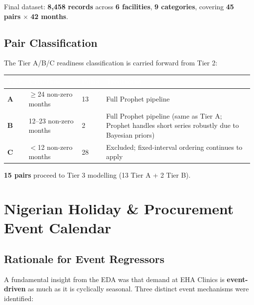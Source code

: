 \documentclass[12pt, a4paper]{article}
\begin{document}
Final dataset: \textbf{8,458 records} across \textbf{6 facilities},
\textbf{9 categories}, covering \textbf{45 pairs} $\times$ \textbf{42 months}.

\subsection{Pair Classification}

The Tier A/B/C readiness classification is carried forward from Tier 2:

\vspace{0.5em}
\noindent
\begin{tabularx}{\textwidth}{@{} C{1.6cm} L{3.2cm} R{1.8cm} X @{}}
  \toprule
  \textcolor{white}{\textbf{Tier}} &
  \textcolor{white}{\textbf{Criterion}} &
  \textcolor{white}{\textbf{Pairs}} &
  \textcolor{white}{\textbf{Treatment}} \\
  \midrule
  \textbf{A} & $\geq$24 non-zero months & 13 & Full Prophet pipeline \\
  \textbf{B} & 12--23 non-zero months & 2 &
    Full Prophet pipeline (same as Tier A; Prophet handles short series
    robustly due to Bayesian priors) \\
  \textbf{C} & $<$12 non-zero months & 28 &
    Excluded; fixed-interval ordering continues to apply \\
  \bottomrule
\end{tabularx}

\vspace{0.5em}
\textbf{15 pairs} proceed to Tier 3 modelling (13 Tier A + 2 Tier B).

\section{Nigerian Holiday \& Procurement Event Calendar}

\subsection{Rationale for Event Regressors}

A fundamental insight from the EDA was that demand at EHA Clinics is
\textbf{event-driven} as much as it is cyclically seasonal. Three
distinct event mechanisms were identified:
\end{document}
